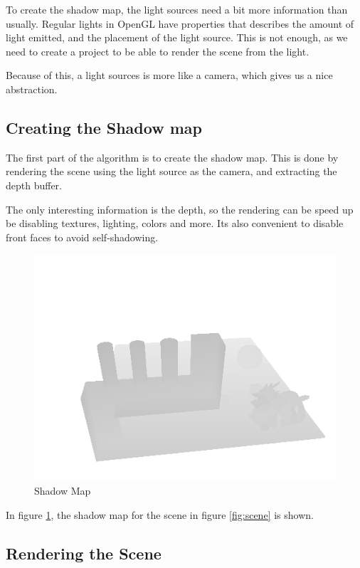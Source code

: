 To create the shadow map, the light sources need a bit more
information than usually. Regular lights in OpenGL have properties
that describes the amount of light emitted, and the placement of the
light source. This is not enough, as we need to create a project to be
able to render the scene from the light. 

Because of this, a light sources is more like a camera, which gives us
a nice abstraction. 


\subsection{Creating the Shadow map}

The first part of the algorithm is to create the shadow map. This is
done by rendering the scene using the light source as the camera, and
extracting the depth buffer.

 The only interesting information is
the depth, so the rendering can be speed up be disabling textures,
lighting, colors and more. Its also convenient to disable front faces
to avoid self-shadowing. %

\begin{figure}[h]
  \centering
  \includegraphics[width=\textwidth]{gfx/shadowmap}  
  \caption{Shadow Map}
  \label{fig:shadowmap}
\end{figure}

In figure \ref{fig:shadowmap}, the shadow map for the scene in figure
\ref{fig:scene} is shown.

\subsection{Rendering the Scene}\label{sec:render}


